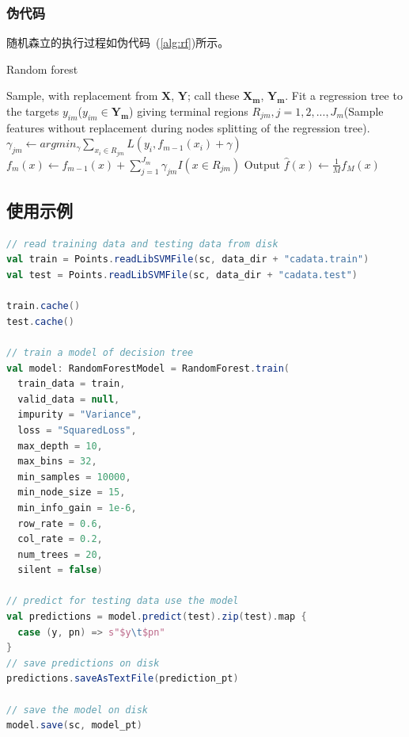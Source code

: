 \documentclass[a4paper,11pt,         %
               ]{article}
\begin{document}
\subsubsection{伪代码}

随机森立的执行过程如伪代码~(\ref{alg:rf})所示。


\begin{algorithm}
  \caption{Random forest}
  \label{alg:rf}
  \begin{algorithmic}[1] %
    \State Sample, with replacement from $\mathbf{X}$, $\mathbf{Y}$; call these $\mathbf{X_{m}}$, $\mathbf{Y_{m}}$.
    \State Fit a regression tree to the targets $y_{im}$($y_{im} \in \mathbf{Y_{m}}$) giving terminal regions $R_{jm}, j = 1,2,...,J_{m}$(Sample features without replacement during nodes splitting of the regression tree).
      \State $\gamma_{jm} \gets argmin_{\gamma} \sum_{x_{i} \in R_{jm}} L\left ( y_{i},f_{m-1}\left ( x_{i} \right ) + \gamma \right )$
    \EndFor
    \State $f_{m}\left ( x \right ) \gets f_{m-1}\left ( x \right ) + \sum_{j=1}^{J_{m}} \gamma_{jm}I\left ( x \in R_{jm} \right )$
  \EndFor
  \State Output $\hat{f}\left ( x \right ) \gets  \frac{1}{M} f_{M}\left ( x \right )$
  \end{algorithmic}
\end{algorithm}

\subsection{使用示例}

\begin{lstlisting}[language={SCALA},title={RunRandomForestDemo.scala}]  
// read training data and testing data from disk
val train = Points.readLibSVMFile(sc, data_dir + "cadata.train")
val test = Points.readLibSVMFile(sc, data_dir + "cadata.test")

train.cache()
test.cache()

// train a model of decision tree
val model: RandomForestModel = RandomForest.train(
  train_data = train,
  valid_data = null,
  impurity = "Variance",
  loss = "SquaredLoss",
  max_depth = 10,
  max_bins = 32,
  min_samples = 10000,
  min_node_size = 15,
  min_info_gain = 1e-6,
  row_rate = 0.6,
  col_rate = 0.2,
  num_trees = 20,
  silent = false)

// predict for testing data use the model
val predictions = model.predict(test).zip(test).map {
  case (y, pn) => s"$y\t$pn"
}
// save predictions on disk
predictions.saveAsTextFile(prediction_pt)

// save the model on disk
model.save(sc, model_pt)
\end{lstlisting} 
\end{document}
